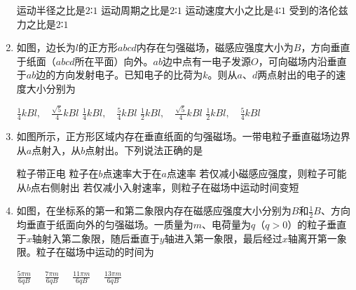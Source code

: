 \begin{enumerate}[leftmargin=0em]
\fourchoices
{运动半径之比是$ 2 $∶$ 1 $}
{运动周期之比是$ 2 $∶$ 1 $}
{运动速度大小之比是$ 4 $∶$ 1 $}
{受到的洛伦兹力之比是$ 2 $∶$ 1 $}


\item
{}
如图，边长为$ l $的正方形$ abcd $内存在匀强磁场，磁感应强度大小为$ B $，方向垂直于纸面（$ abcd $所在平面）向外。$ ab $边中点有一电子发源$ O $，可向磁场内沿垂直于$ ab $边的方向发射电子。已知电子的比荷为$ k $。则从$ a $、$ d $两点射出的电子的速度大小分别为  
\begin{figure}[h!]
\centering

\end{figure}

\fourchoices
{$\frac { 1 } { 4 } k B l , \quad \frac { \sqrt { 5 } } { 4 } k B l$}
{$\frac { 1 } { 4 } k B l , \quad \frac { 5 } { 4 } k B l$}
{$\frac { 1 } { 2 } k B l , \quad \frac { \sqrt { 5 } } { 4 } k B l$}
{$\frac { 1 } { 2 } k B l , \quad \frac { 5 } { 4 } k B l$}




\item
{}
如图所示，正方形区域内存在垂直纸面的匀强磁场。一带电粒子垂直磁场边界从$ a $点射入，从$ b $点射出。下列说法正确的是  
\begin{figure}[h!]
\centering

\end{figure}



\fourchoices
{粒子带正电}
{粒子在$ b $点速率大于在$ a $点速率}
{若仅减小磁感应强度，则粒子可能从$ b $点右侧射出}
{若仅减小入射速率，则粒子在磁场中运动时间变短}




\item
{}
如图，在坐标系的第一和第二象限内存在磁感应强度大小分别为$ B $和$ \frac{ 1 }{ 2 } B $、方向均垂直于纸面向外的匀强磁场。一质量为$ m $、电荷量为$ q $（$ q>0 $）的粒子垂直于$ x $轴射入第二象限，随后垂直于$ y $轴进入第一象限，最后经过$ x $轴离开第一象限。粒子在磁场中运动的时间为  

\begin{figure}[h!]
\centering

\end{figure}

\fourchoices
{$\frac { 5 \pi m } { 6 q B } \quad$}
{$\frac { 7 \pi m } { 6 q B } \quad$}
{$\frac { 11 \pi m } { 6 q B } \quad$}
{$\frac { 13 \pi m } { 6 q B }$}


\end{enumerate}
